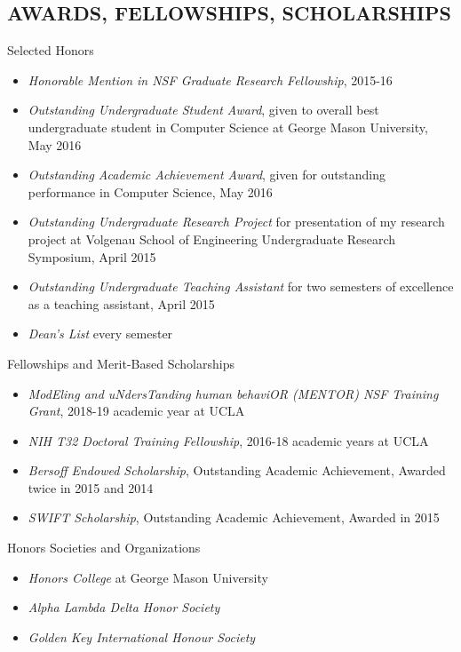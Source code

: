 \documentclass[margin, 10pt]{res} %
\begin{document}
\begin{resume}

\section{AWARDS, FELLOWSHIPS, SCHOLARSHIPS} 

Selected Honors
\begin{itemize} \itemsep -2pt %
\item {\sl Honorable Mention in NSF Graduate Research Fellowship}, 2015-16
\item {\sl Outstanding Undergraduate Student Award}, given to overall best undergraduate student in Computer Science at George Mason University, May 2016
\item {\sl Outstanding Academic Achievement Award}, given for outstanding performance in Computer Science, May 2016
\item {\sl Outstanding Undergraduate Research Project} for presentation of my research project at Volgenau School of Engineering Undergraduate Research Symposium, April 2015
\item {\sl Outstanding Undergraduate Teaching Assistant} for two semesters of excellence as a teaching assistant, April 2015
\item {\sl Dean's List} every semester
\end{itemize}

Fellowships and Merit-Based Scholarships
\begin{itemize} \itemsep -2pt %
\item {\sl ModEling and uNdersTanding human behaviOR (MENTOR) NSF Training Grant}, 2018-19 academic year at UCLA
\item {\sl NIH T32 Doctoral Training Fellowship}, 2016-18 academic years at UCLA
\item {\sl Bersoff Endowed Scholarship}, Outstanding Academic Achievement, Awarded twice in 2015 and 2014
\item {\sl SWIFT Scholarship}, Outstanding Academic Achievement, Awarded in 2015
\end{itemize}

Honors Societies and Organizations
\begin{itemize} \itemsep -2pt %
\item {\sl Honors College} at George Mason University
\item {\sl Alpha Lambda Delta Honor Society}
\item {\sl Golden Key International Honour Society}
\end{itemize}


\end{resume}
\end{document}
